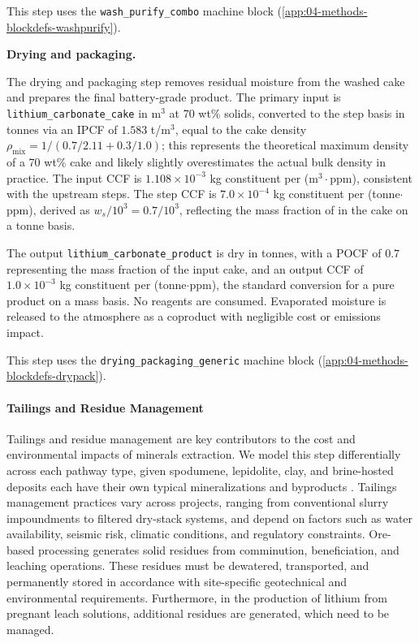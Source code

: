 This step uses the \texttt{wash\_purify\_combo} machine block (\ref{app:04-methods-blockdefs-washpurify}).

 
\medskip
\noindent\textbf{Drying and packaging.}\quad

The drying and packaging step removes residual moisture from the washed  cake and prepares the final battery-grade product. The primary input is \texttt{lithium\_carbonate\_cake} in m$^3$ at 70 wt\% solids, converted to the step basis in tonnes via an IPCF of $1.583$ t/m$^3$, equal to the cake density $\rho_\text{mix} = 1/(0.7/2.11 + 0.3/1.0)$; this represents the theoretical maximum density of a 70 wt\%  cake and likely slightly overestimates the actual bulk density in practice. The input CCF is $1.108 \times 10^{-3}$ kg constituent per (m$^3 \cdot$ppm), consistent with the upstream steps. The step CCF is $7.0 \times 10^{-4}$ kg constituent per (tonne$\cdot$ppm), derived as $w_s / 10^3 = 0.7 / 10^3$, reflecting the mass fraction of  in the cake on a tonne basis.
 
The output \texttt{lithium\_carbonate\_product} is dry  in tonnes, with a POCF of $0.7$ representing the  mass fraction of the input cake, and an output CCF of $1.0 \times 10^{-3}$ kg constituent per (tonne$\cdot$ppm), the standard conversion for a pure product on a mass basis. No reagents are consumed. Evaporated moisture is released to the atmosphere as a coproduct with negligible cost or emissions impact.

This step uses the \texttt{drying\_packaging\_generic} machine block (\ref{app:04-methods-blockdefs-drypack}).

\paragraph{Tailings and Residue Management}\label{app:04-methods-facilitychoices-tailings}

Tailings and residue management are key contributors to the cost and environmental impacts of minerals extraction. We model this step differentially across each pathway type, given spodumene, lepidolite, clay, and brine-hosted deposits each have their own typical mineralizations and byproducts \citep{khakmardanComparativeLifeCycle2023, chordiaLifeCycleEnvironmental2022, setuEnvironmentalImpactAssessment2026, royLithiumClayAssessing2024}. Tailings management practices vary across projects, ranging from conventional slurry impoundments to filtered dry-stack systems, and depend on factors such as water availability, seismic risk, climatic conditions, and regulatory constraints. Ore-based processing generates solid residues from comminution, beneficiation, and leaching operations. These residues must be dewatered, transported, and permanently stored in accordance with site-specific geotechnical and environmental requirements. Furthermore, in the production of lithium from pregnant leach solutions, additional residues are generated, which need to be managed. 

